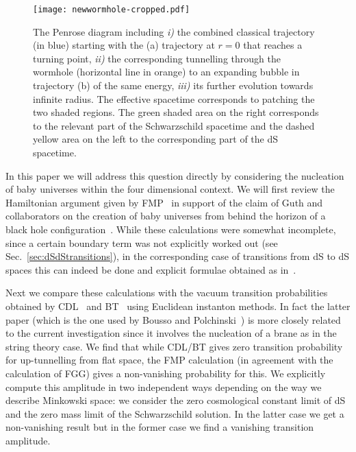 \documentclass[11pt,a4paper]{article}
\begin{document}
\begin{figure}[h!] 
\begin{center} 
\texttt{[image: newwormhole-cropped.pdf]}  
\caption{\footnotesize{The Penrose diagram including \textit{i)} the combined classical trajectory (in blue) starting with the (a) trajectory at $r=0$ that reaches a turning point, \textit{ii)} the corresponding tunnelling through the wormhole (horizontal line in orange) to an expanding bubble in trajectory (b) of the same energy, \textit{iii)} its further evolution towards infinite radius. The effective spacetime corresponds to patching the two shaded regions. The green shaded area on the right corresponds to the relevant part of the Schwarzschild spacetime and the dashed yellow area on the left to the corresponding part of the dS spacetime.\label{fig:CompositePenrose}}}
\end{center} 
\end{figure} 

In this paper we will  address this question directly by considering 
 the nucleation of baby universes  within the four dimensional
context. We will first review the Hamiltonian argument given by FMP~\cite{Fischler:1989se, Fischler:1990pk} in
support of the claim of Guth and collaborators on the creation of
baby universes from behind the horizon of a black hole configuration~\cite{Blau:1986cw,Farhi:1986ty,Farhi:1989yr}.
While these calculations were somewhat incomplete, since a certain
boundary term was not explicitly worked out (see Sec.~\ref{sec:dSdStransitions}), in the corresponding case of transitions from dS to dS spaces this can indeed be done and explicit formulae obtained as in~\cite{Bachlechner:2016mtp}. 


Next we compare these calculations with the vacuum transition probabilities obtained by CDL~\cite{Coleman:1980aw} and BT~\cite{Brown:1988kg} using Euclidean instanton methods. In fact the latter paper (which is the one used by Bousso and Polchinski~\cite{Bousso:2000xa}) is more closely related to the current investigation since it involves the nucleation of  a brane as in the string theory case. We find that while CDL/BT gives zero transition probability for up-tunnelling from flat space, the FMP calculation (in agreement with  the calculation of FGG) gives a non-vanishing probability for this. We explicitly compute this amplitude in two independent ways depending on the way we describe Minkowski space: we consider the zero cosmological constant limit of dS and the zero mass limit of the Schwarzschild solution. In the latter case we get a non-vanishing result but in the former case we find a vanishing transition amplitude. 
\end{document}
